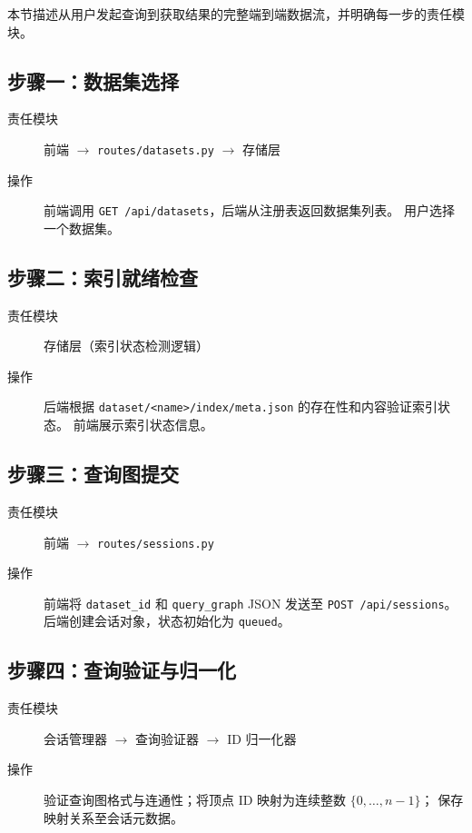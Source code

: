 \documentclass[12pt,a4paper]{article}
\begin{document}
本节描述从用户发起查询到获取结果的完整端到端数据流，并明确每一步的责任模块。

\subsection{步骤一：数据集选择}
\begin{description}
  \item[责任模块] 前端 $\to$ \texttt{routes/datasets.py} $\to$ 存储层
  \item[操作] 前端调用 \texttt{GET /api/datasets}，后端从注册表返回数据集列表。
        用户选择一个数据集。
\end{description}

\subsection{步骤二：索引就绪检查}
\begin{description}
  \item[责任模块] 存储层（索引状态检测逻辑）
  \item[操作] 后端根据 \texttt{dataset/<name>/index/meta.json} 的存在性和内容验证索引状态。
        前端展示索引状态信息。
\end{description}

\subsection{步骤三：查询图提交}
\begin{description}
  \item[责任模块] 前端 $\to$ \texttt{routes/sessions.py}
  \item[操作] 前端将 \texttt{dataset\_id} 和 \texttt{query\_graph} JSON 发送至
        \texttt{POST /api/sessions}。后端创建会话对象，状态初始化为 \texttt{queued}。
\end{description}

\subsection{步骤四：查询验证与归一化}
\begin{description}
  \item[责任模块] 会话管理器 $\to$ 查询验证器 $\to$ ID 归一化器
  \item[操作] 验证查询图格式与连通性；将顶点 ID 映射为连续整数 $\{0, \dots, n{-}1\}$；
        保存映射关系至会话元数据。
\end{description}
\end{document}
